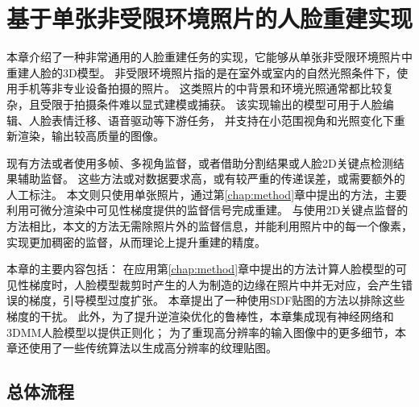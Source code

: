 \chapter{基于单张非受限环境照片的人脸重建实现}
\label{chap:recon}

本章介绍了一种非常通用的人脸重建任务的实现，它能够从单张非受限环境照片中重建人脸的3D模型。
非受限环境照片指的是在室外或室内的自然光照条件下，使用手机等非专业设备拍摄的照片。
这类照片的中背景和环境光照通常都比较复杂，且受限于拍摄条件难以显式建模或捕获。
该实现输出的模型可用于人脸编辑、人脸表情迁移、语音驱动等下游任务，
并支持在小范围视角和光照变化下重新渲染，输出较高质量的图像。

现有方法或者使用多帧、多视角监督，或者借助分割结果或人脸2D关键点检测结果辅助监督。
这些方法或对数据要求高，或有较严重的传递误差，或需要额外的人工标注。
本文则只使用单张照片，通过第\ref{chap:method}章中提出的方法，主要利用可微分渲染中可见性梯度提供的监督信号完成重建。
与使用2D关键点监督的方法相比，本文的方法无需除照片外的监督信息，并能利用照片中的每一个像素，实现更加稠密的监督，从而理论上提升重建的精度。

本章的主要内容包括：
在应用第\ref{chap:method}章中提出的方法计算人脸模型的可见性梯度时，人脸模型裁剪时产生的人为制造的边缘在照片中并无对应，会产生错误的梯度，引导模型过度扩张。
本章提出了一种使用SDF贴图的方法以排除这些梯度的干扰。
此外，为了提升逆渲染优化的鲁棒性，本章集成现有神经网络和3DMM人脸模型以提供正则化；
为了重现高分辨率的输入图像中的更多细节，本章还使用了一些传统算法以生成高分辨率的纹理贴图。

\section{总体流程}

